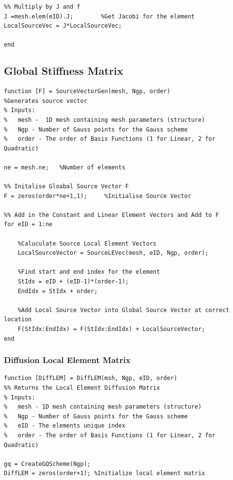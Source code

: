 \documentclass[11pt]{article}
\begin{document}
\begin{appendices}
\begin{lstlisting}
%% Multiply by J and f
J =mesh.elem(eID).J;        %Get Jacobi for the element
LocalSourceVec = J*LocalSourceVec;

end

\end{lstlisting}
\pagebreak

\subsection{Global Stiffness Matrix}\label{ap:Stiff}
\begin{lstlisting}
function [F] = SourceVectorGen(mesh, Ngp, order)
%Generates source vector
% Inputs:
%   mesh -  1D mesh containing mesh parameters (structure)
%   Ngp - Number of Gauss points for the Gauss scheme
%   order - The order of Basis Functions (1 for Linear, 2 for Quadratic)

ne = mesh.ne;   %Number of elements

%% Initalise Gloabal Source Vector F
F = zeros(order*ne+1,1);     %Initialise Source Vector

%% Add in the Constant and Linear Element Vectors and Add to F
for eID = 1:ne
    
    %Caluculate Source Local Element Vectors
    LocalSourceVector = SourceLEVec(mesh, eID, Ngp, order);
    
    %Find start and end index for the element
    StIdx = eID + (eID-1)*(order-1);
    EndIdx = StIdx + order;
    
    %Add Local Source Vector into Global Source Vector at correct location
    F(StIdx:EndIdx) = F(StIdx:EndIdx) + LocalSourceVector;
end

\end{lstlisting}
\pagebreak


\subsubsection{Diffusion Local Element Matrix}\label{ap:DiffLEM}

\begin{lstlisting}
function [DiffLEM] = DiffLEM(msh, Ngp, eID, order)
%% Returns the Local Element Diffusion Matrix
% Inputs:
%   mesh - 1D mesh containing mesh parameters (structure)
%   Ngp - Number of Gauss points for the Gauss scheme 
%   eID - The elements unique index
%   order - The order of Basis Functions (1 for Linear, 2 for Quadratic)

gq = CreateGQScheme(Ngp);
DiffLEM = zeros(order+1); %Initialize local element matrix


\end{lstlisting}
\end{appendices}
\end{document}
